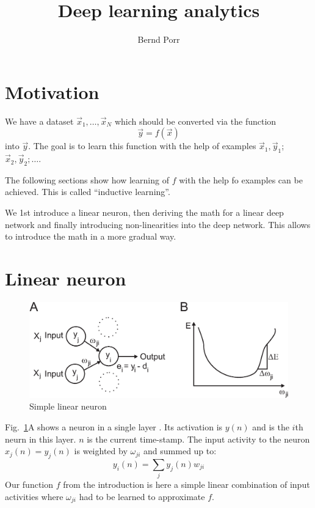 \documentclass[12pt]{article}
\author{Bernd Porr}
\title{Deep learning analytics}
\begin{document}
\maketitle

\section{Motivation}
We have a dataset $\vec{x}_1, \ldots, \vec{x}_N$ which should be converted
via the function
\begin{equation}
  \vec{y}=f(\vec{x}) \label{inductive}
\end{equation}
into $\vec{y}$. The goal is to learn this function with the help of
examples $\vec{x}_1,\vec{y}_1$; $\vec{x}_2,\vec{y}_2; \ldots$.

The following sections show how learning of $f$ with the help
fo examples can be achieved. This is called ``inductive learning''.

We 1st introduce a linear neuron, then deriving the math for a linear deep
network and finally introducing non-linearities into the deep network.
This allows to introduce the math in a more gradual way.

\section{Linear neuron}

\begin{figure}[!hbt]
\begin{center}
\mbox{\includegraphics[width=\textwidth]{one_layer}}
\end{center}
\caption{Simple linear neuron
\label{one_layer}}
\end{figure}

Fig.~\ref{one_layer}A shows a neuron in a single layer \citep{Rosenblatt58}.
Its activation is $y(n)$ and is the $i$th neurn in this layer.
$n$ is the current time-stamp. The input activity to the neuron $x_j(n) =
y_j(n)$ is weighted by $\omega_{ji}$ and summed up to:
\begin{equation}
  y_i(n) = \sum_j y_j(n) w_{ji} \label{linear_sum}
\end{equation}
Our function $f$ from the introduction is here a simple linear
combination of input activities where $\omega_{ji}$ had to be learned
to approximate $f$.
\end{document}

